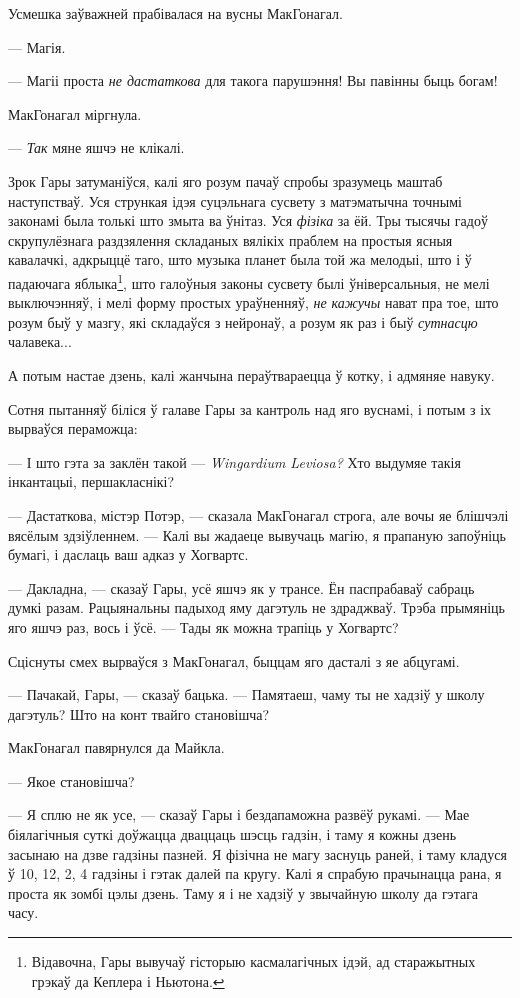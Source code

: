 Усмешка заўважней прабівалася на вусны МакГонагал. 

--- Магія.

--- Магіі проста \emph{не дастаткова} для такога парушэння! Вы павінны быць богам!

МакГонагал міргнула.

--- \emph{Так} мяне яшчэ не клікалі.

Зрок Гары затуманіўся, калі яго розум пачаў спробы зразумець маштаб наступстваў. Уся стрункая
ідэя суцэльнага сусвету з матэматычна точнымі законамі была толькі што змыта ва ўнітаз. Уся 
\emph{фізіка} за ёй. Тры тысячы гадоў скрупулёзнага раздзялення складаных вялікіх праблем
на простыя ясныя кавалачкі, адкрыццё таго, што музыка планет была той жа мелодыі, што і ў падаючага
яблыка\footnote{
{}Відавочна, Гары вывучаў гісторыю касмалагічных ідэй, ад старажытных грэкаў да Кеплера і Ньютона.
}, што галоўныя законы сусвету былі ўніверсальныя, не мелі выключэнняў, і мелі форму
простых ураўненняў, \emph{не кажучы} нават пра тое, што розум быў у мазгу, які складаўся з
нейронаў, а розум як раз і быў \emph{сутнасцю} чалавека...

А потым настае дзень, калі жанчына пераўтвараецца ў котку, і адмяняе навуку.

Сотня пытанняў біліся ў галаве Гары за кантроль над яго вуснамі, і потым з іх вырваўся пераможца:

--- І што гэта за заклён такой --- \emph{Wingardium Leviosa?} Хто выдумяе такія інкантацыі,
першакласнікі?

--- Дастаткова, містэр Потэр, --- сказала МакГонагал строга, але вочы яе блішчэлі вясёлым 
здзіўленнем. --- Калі вы жадаеце вывучаць магію, я прапаную запоўніць бумагі, і даслаць
ваш адказ у Хогвартс.

--- Дакладна, --- сказаў Гары, усё яшчэ як у трансе. Ён паспрабаваў сабраць думкі разам. Рацыянальны
падыход яму дагэтуль не здраджваў. Трэба прымяніць яго яшчэ раз, вось і ўсё. --- Тады як можна 
трапіць у Хогвартс?

Сціснуты смех вырваўся з МакГонагал, быццам яго дасталі з яе абцугамі.

--- Пачакай, Гары, --- сказаў бацька. --- Памятаеш, чаму ты не хадзіў у школу дагэтуль? Што на конт
твайго становішча?

МакГонагал павярнулся да Майкла. 

--- Якое становішча?

--- Я сплю не як усе, --- сказаў Гары і бездапаможна развёў рукамі. --- Мае біялагічныя суткі 
доўжацца дваццаць шэсць гадзін, і таму я кожны дзень засынаю на дзве гадзіны пазней. 
Я фізічна не магу заснуць раней, і таму кладуся ў 10, 12, 2, 4 гадзіны і гэтак далей па кругу.
Калі я спрабую прачынацца рана, я проста як зомбі цэлы дзень. Таму я і не хадзіў у звычайную
школу да гэтага часу.

